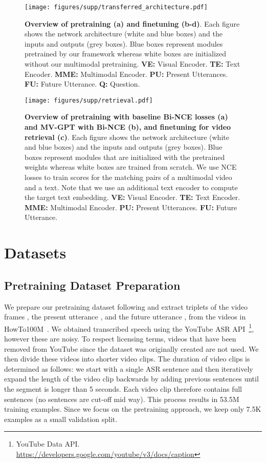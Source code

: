 \documentclass[10pt,twocolumn,letterpaper]{article}
\begin{document}
\begin{figure*}
    \centering
    \texttt{[image: figures/supp/transferred\_architecture.pdf]}
    \caption{\textbf{Overview of pretraining (a) and finetuning (b-d)}. Each figure shows the network architecture (white and blue boxes) and the inputs and outputs (grey boxes). Blue boxes represent modules pretrained by our framework whereas white boxes are initialized without our multimodal pretraining.
    \textbf{VE:} Visual Encoder. \textbf{TE:} Text Encoder. \textbf{MME:} Multimodal Encoder. \textbf{PU:} Present Utterances. \textbf{FU:} Future Utterance. \textbf{Q:} Question. 
    }
    \label{fig:supp_transfer_arch}
\end{figure*}


\begin{figure*}[!ht]
    \centering
    \texttt{[image: figures/supp/retrieval.pdf]}
    \caption{\textbf{Overview of pretraining with baseline Bi-NCE losses (a) and MV-GPT with Bi-NCE (b), and finetuning for video retrieval (c)}. Each figure shows the network architecture (white and blue boxes) and the inputs and outputs (grey boxes). 
    Blue boxes represent modules that are initialized with the pretrained weights whereas white boxes are trained from scratch.
    We use NCE losses to train scores for the matching pairs of a multimodal video and a text.
    Note that we use an additional text encoder to compute the target text embedding.
    \textbf{VE:} Visual Encoder. \textbf{TE:} Text Encoder. \textbf{MME:} Multimodal Encoder. \textbf{PU:} Present Utterances. \textbf{FU:} Future Utterance.}
    \label{fig:supp_retrieval}
\end{figure*}
\section{Datasets}
\label{sec:supp-dataset}
\subsection{Pretraining Dataset Preparation} 
We prepare our pretraining dataset following \cite{seo2021look} and extract triplets  of the video frames , the present utterance , and the future utterance , from the videos in HowTo100M~\cite{miech2019howto100m}.
We obtained transcribed speech using the YouTube ASR API~\footnote{YouTube  Data  API. \url{https://developers.google.com/youtube/v3/docs/caption}}, however these are noisy. 
To respect licensing terms, videos that have been removed from YouTube since the dataset was originally created are not used.
We then divide these videos into shorter video clips. 
The duration of video clips is determined as follows: we start with a single ASR sentence and then iteratively expand the length of the video clip backwards by adding previous sentences until the segment is longer than 5 seconds.
Each video clip therefore contains full sentences (no sentences are cut-off mid way). 
This process results in 53.5M training examples.
Since we focus on the pretraining approach, we keep only 7.5K examples as a small validation split.
\end{document}
